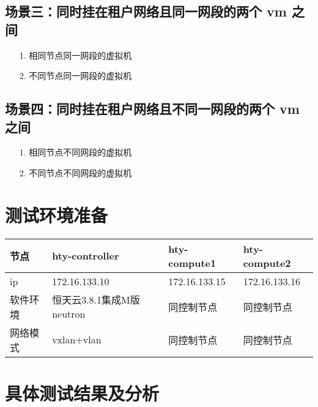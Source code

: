 \documentclass[a4paper,left=1.5cm,right=1.5cm,11pt]{article}
\begin{document}
\subsection{场景三：同时挂在租户网络且同一网段的两个 vm 之间}
\begin{itemize}
	\item[1.]相同节点同一网段的虚拟机
	\item[2.]不同节点同一网段的虚拟机
\end{itemize}
\subsection{场景四：同时挂在租户网络且不同一网段的两个 vm 之间}
\begin{itemize}
	\item[1.]相同节点不同网段的虚拟机
	\item[2.]不同节点不同网段的虚拟机
\end{itemize}

\section{测试环境准备}
\begin{center}
\begin{tabular}[c]{|l|l|l|l|}
\hline
节点 & hty-controller & hty-compute1 & hty-compute2  \\
\hline
ip  & 172.16.133.10 & 172.16.133.15 & 172.16.133.16 \\
\hline
软件环境  & 恒天云3.8.1集成M版neutron & 同控制节点 & 同控制节点\\
\hline
网络模式  & vxlan+vlan & 同控制节点 & 同控制节点 \\
\hline
\end{tabular}
\end{center}

\section{具体测试结果及分析}
\end{document}
